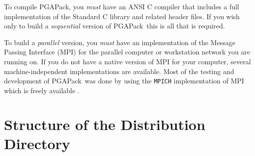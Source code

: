 \documentclass{report}
\newcommand{\pga}{PGAPack}
\begin{document}
To compile \pga, you {\em must} have an ANSI C compiler that includes a full
implementation of the Standard C library and related header files.  
If you wish only to build a {\em sequential} version of \pga\ this is all that
is required.

To build a {\em parallel} version, you {\em must} have an implementation of the
Message Passing Interface (MPI) \cite{MPI-final,GrLuSk94} for the parallel
computer or workstation network you are running on.  If you do not have a
native version of MPI for your computer, several machine-independent
implementations are available.  Most of the testing and development of \pga\ was
done by using the {\tt MPICH} implementation of MPI which is freely available
\cite{mpich-web-page}.


%

\section{Structure of the Distribution Directory}\label{sec:dirstruc}
\end{document}
